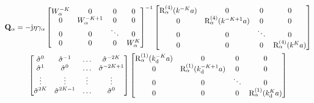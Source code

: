 \begin{figure*}
\setcounter{tempEQCounter}{\value{equation}}
\setcounter{equation}{66}
\begin{multline}
    \mathbf{Q}_\alpha = -\mathrm{j}\eta \gamma_\alpha 
    \begin{bmatrix}
    W_\alpha^{-K} & 0 & 0 & 0 \\
    0 & W_\alpha^{-K+1} & 0 & 0\\
    0 & 0 & \ddots & 0\\
    0 & 0 & 0 & W_\alpha^{K}
    \end{bmatrix}^{-1}
    \begin{bmatrix}
    \mathrm{R}_\alpha^{(4)}(k^{-K}a) & 0 & 0 & 0 \\
    0 & \mathrm{R}_\alpha^{(4)}(k^{-K+1}a) & 0 & 0\\
    0 & 0 & \ddots & 0\\
    0 & 0 & 0 & \mathrm{R}_\alpha^{(4)}(k^{K} a)
    \end{bmatrix}\\
    \begin{bmatrix}
    \hat{\sigma}^{0} &  \hat{\sigma}^{-1} & \hdots & \hat{\sigma}^{-2K} \\
    \hat{\sigma}^{1} &  \hat{\sigma}^0 & \hdots & \hat{\sigma}^{-2K+1} \\
    \vdots & \vdots & \vdots & \vdots\\
    \hat{\sigma}^{2K} &  \hat{\sigma}^{2K-1} & \hdots & \hat{\sigma}^0 \\
    \end{bmatrix}
    \begin{bmatrix}
    \mathrm{R}_\alpha^{(1)}(k_{\mathrm{d}}^{-K}a) & 0 & 0 & 0 \\
    0 & \mathrm{R}_\alpha^{(1)}(k_{\mathrm{d}}^{-K+1}a) & 0 & 0\\
    0 & 0 & \ddots & 0\\
    0 & 0 & 0 & \mathrm{R}_\alpha^{(1)}(k_{\mathrm{d}}^{K}a)
    \end{bmatrix}
    \label{eq:ymatrix-long}
\end{multline}
\hrulefill
\vspace*{4pt}
\end{figure*}
\setcounter{equation}{\value{tempEQCounter}}